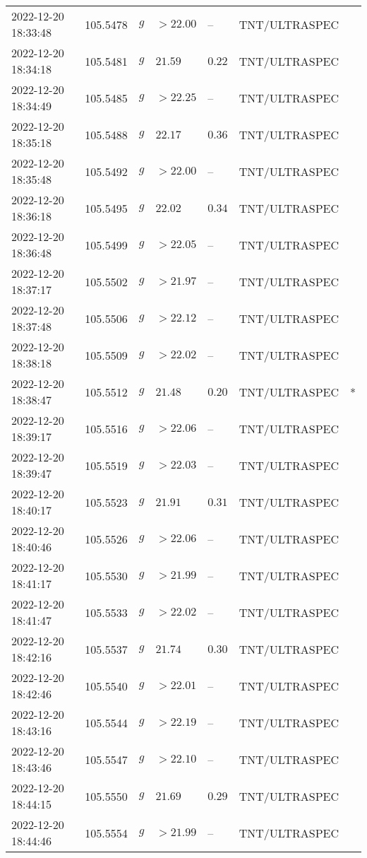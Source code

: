 \documentclass{nature_plusfigure}
\begin{document}
\begin{supplement}
\begin{center}
\begin{longtable}{lllllll}
2022-12-20 18:33:48 & 105.5478 & $g$ & $>22.00$ & -- & TNT/ULTRASPEC &  \\ 
2022-12-20 18:34:18 & 105.5481 & $g$ & $21.59$ & $0.22$ & TNT/ULTRASPEC &  \\ 
2022-12-20 18:34:49 & 105.5485 & $g$ & $>22.25$ & -- & TNT/ULTRASPEC &  \\ 
2022-12-20 18:35:18 & 105.5488 & $g$ & $22.17$ & $0.36$ & TNT/ULTRASPEC &  \\ 
2022-12-20 18:35:48 & 105.5492 & $g$ & $>22.00$ & -- & TNT/ULTRASPEC &  \\ 
2022-12-20 18:36:18 & 105.5495 & $g$ & $22.02$ & $0.34$ & TNT/ULTRASPEC &  \\ 
2022-12-20 18:36:48 & 105.5499 & $g$ & $>22.05$ & -- & TNT/ULTRASPEC &  \\ 
2022-12-20 18:37:17 & 105.5502 & $g$ & $>21.97$ & -- & TNT/ULTRASPEC &  \\ 
2022-12-20 18:37:48 & 105.5506 & $g$ & $>22.12$ & -- & TNT/ULTRASPEC &  \\ 
2022-12-20 18:38:18 & 105.5509 & $g$ & $>22.02$ & -- & TNT/ULTRASPEC &  \\ 
2022-12-20 18:38:47 & 105.5512 & $g$ & $21.48$ & $0.20$ & TNT/ULTRASPEC & * \\ 
2022-12-20 18:39:17 & 105.5516 & $g$ & $>22.06$ & -- & TNT/ULTRASPEC &  \\ 
2022-12-20 18:39:47 & 105.5519 & $g$ & $>22.03$ & -- & TNT/ULTRASPEC &  \\ 
2022-12-20 18:40:17 & 105.5523 & $g$ & $21.91$ & $0.31$ & TNT/ULTRASPEC &  \\ 
2022-12-20 18:40:46 & 105.5526 & $g$ & $>22.06$ & -- & TNT/ULTRASPEC &  \\ 
2022-12-20 18:41:17 & 105.5530 & $g$ & $>21.99$ & -- & TNT/ULTRASPEC &  \\ 
2022-12-20 18:41:47 & 105.5533 & $g$ & $>22.02$ & -- & TNT/ULTRASPEC &  \\ 
2022-12-20 18:42:16 & 105.5537 & $g$ & $21.74$ & $0.30$ & TNT/ULTRASPEC &  \\ 
2022-12-20 18:42:46 & 105.5540 & $g$ & $>22.01$ & -- & TNT/ULTRASPEC &  \\ 
2022-12-20 18:43:16 & 105.5544 & $g$ & $>22.19$ & -- & TNT/ULTRASPEC &  \\ 
2022-12-20 18:43:46 & 105.5547 & $g$ & $>22.10$ & -- & TNT/ULTRASPEC &  \\ 
2022-12-20 18:44:15 & 105.5550 & $g$ & $21.69$ & $0.29$ & TNT/ULTRASPEC &  \\ 
2022-12-20 18:44:46 & 105.5554 & $g$ & $>21.99$ & -- & TNT/ULTRASPEC &  \\ 

\end{longtable}
\end{center}
\end{supplement}
\end{document}
